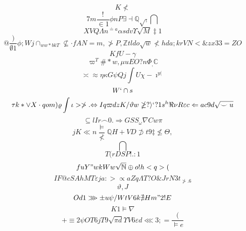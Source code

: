 \documentclass[12pt]{article}
\begin{document}
        \begin{minipage}[t][0pt]{\linewidth}

        \[K\nless\]
\[7m\frac{!}{\in 1}\phi n P\exists\dashv\mathbb{Q}\sqrt{,}\bigcap\]
\[XVQ\Lambda n^{\doteq a}\alpha s d v\Upsilon\sqrt{M}\ddagger 1\]
\[@\frac{)}{\emptyset 1}\phi ; W j\cap_{ww*bkT}\nsubseteq\cdot {fAN=m,}\ngtr P , {\mathbb{Z}} t l d o\sqrt{w}\nless h d a ; k r V N <\& z x 3 3 = Z O\]
\[KfU-\gamma\]
\[\varpi^{T}\# * w ,\mu u E O ? n\Phi_{,}\mathbb{C}\]
\[\asymp\approx\eta\kappa G\psi Q j\int U\chi -\imath^{y(}\]
\[W`\cap s\]
\[\tau k *\lor X\cdot q o m )\varrho\int\iota >\ngtr . {\Leftrightarrow I q}\varpi d z K /\vartheta w\ngeq ?\rangle ` ? 1 s^{h}\Re\nu R\varepsilon c\Leftarrow a c 9 d\sqrt{\smile u}\]
\[\subseteq l I r\frown 0 .\Longrightarrow G S S_{\omega}\nabla C w\pi\]
\[jK\ll n\frac{\models}{\nless}\mathbb{Q} H + V D\not\supset t {9}\ddagger\nleq\Theta ,\]
\[\bigcap\]
\[T(rDSP!.:1\]
\[fuY"wkWw\sqrt{\mathbb{N}}\oplus o ! h < q > (\]
\[IF@cSAhMT\varepsilon j a : >\propto a Z q\Lambda T ? O\& J r N 3 t_{\ngtr . 6}\]
\[\vartheta , J\]
\[Od1\ggg {\pm u}\psi / W t V 6 k\nexists H m " 2 ! E\]
\[K1\models\nabla\]
\[+\equiv 2\psi O T 6 j T 9\sqrt{\pi d}\Upsilon V 6\varepsilon d\lll 3 ; =\frac{(}{\models e}
        \]
\end{minipage}
\end{document}
